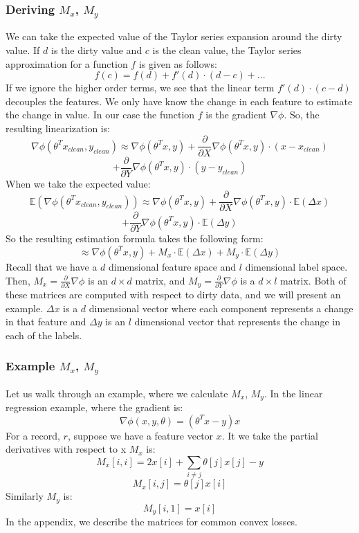 \subsubsection{Deriving $M_x$, $M_y$}
We can take the expected value of the Taylor series expansion around the dirty value.
If $d$ is the dirty value and $c$ is the clean value, the Taylor series approximation for a function $f$ is given as follows:
\[
f(c) = f(d) + f'(d)\cdot(d-c) + ...
\]
If we ignore the higher order terms, we see that the linear term $f'(d)\cdot(c-d)$ decouples the features.
We only have know the change in each feature to estimate the change in value.
In our case the function $f$ is the gradient $\nabla\phi$.
So, the resulting linearization is:
\[
\nabla\phi(\theta^Tx_{clean},y_{clean}) \approx \nabla\phi(\theta^Tx,y) + \frac{\partial}{\partial X}\nabla\phi(\theta^Tx,y)\cdot (x - x_{clean}) \]
\[+ \frac{\partial}{\partial Y}\nabla\phi(\theta^Tx,y)\cdot (y - y_{clean})
\]
When we take the expected value:
\[
\mathbb{E}(\nabla\phi(\theta^Tx_{clean},y_{clean})) \approx \nabla\phi(\theta^Tx,y) + \frac{\partial}{\partial X}\nabla\phi(\theta^Tx,y)\cdot \mathbb{E}(\Delta x) \]
\[+ \frac{\partial}{\partial Y}\nabla\phi(\theta^Tx,y)\cdot \mathbb{E}(\Delta y)
\]
So the resulting estimation formula takes the following form:
\[
\approx \nabla\phi(\theta^Tx,y) + M_x \cdot \mathbb{E}(\Delta x) + M_y \cdot \mathbb{E}(\Delta y) 
\]
Recall that we have a $d$ dimensional feature space and $l$ dimensional label space.
Then, $M_x = \frac{\partial}{\partial X}\nabla\phi$ is an $d \times d$ matrix, and $M_y = \frac{\partial}{\partial Y}\nabla\phi$ is a $d \times l$ matrix.
Both of these matrices are computed with respect to dirty data, and we will present an example.
$\Delta x$ is a $d$ dimensional vector where each component represents a change in that feature and $\Delta y$ is an $l$ dimensional vector that represents the change in each of the labels. 

\subsubsection{Example $M_x$, $M_y$}
Let us walk through an example, where we calculate $M_x$, $M_y$.
In the linear regression example, where the gradient is:
\[
\nabla\phi(x,y,\theta) = (\theta^Tx - y)x
\]
For a record, $r$, suppose we have a feature vector $x$.
It we take the partial derivatives with respect to x $M_x$ is:
\[
M_x[i,i] = 2x[i] + \sum_{i \ne j} \theta[j]x[j] - y 
\]
\[
M_x[i,j] = \theta[j]x[i]
\]
Similarly $M_y$ is:
\[
M_y[i,1] = x[i] 
\]
In the appendix, we describe the matrices for common convex losses.

